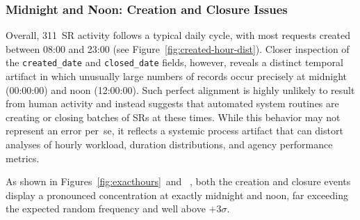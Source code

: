 \documentclass[linenumber]{jdsart}
\begin{document}
\subsubsection{Midnight and Noon: Creation and Closure Issues}
\label{subsubsec:midnightnoonissues}
Overall, 311~\textsc{SR} activity follows a typical
daily cycle, with most requests created between 08{:}00 and 23{:}00
(see Figure~\ref{fig:created-hour-dist}).
Closer inspection of the \texttt{created\_date} and
\texttt{closed\_date} fields, however, reveals a distinct temporal
artifact in which unusually large numbers of records occur precisely at
midnight (00{:}00{:}00) and noon (12{:}00{:}00). Such perfect alignment is highly
unlikely to result from human activity and instead suggests that
automated system routines are creating or closing batches of
\textsc{SR}s at these times. While this behavior may not represent an
error per~se, it reflects a systemic process artifact that can distort
analyses of hourly workload, duration distributions, and agency
performance metrics.

As shown in Figures~\ref{fig:exacthours}~and~%
, both the creation and closure events display
a pronounced concentration at exactly midnight and noon, far exceeding the
expected random frequency and well above \( +3\sigma. \) 
\end{document}
